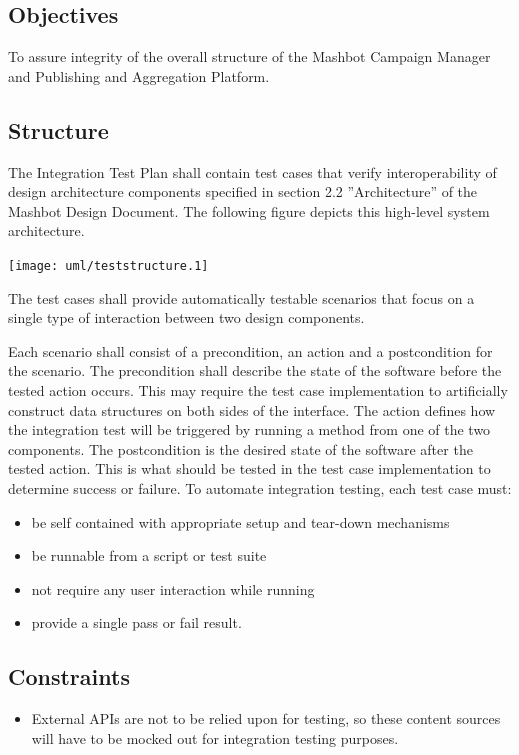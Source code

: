 \documentclass[12pt]{article}
\begin{document}
\subsection{Objectives}
To assure integrity of the overall structure of the Mashbot Campaign Manager and Publishing and Aggregation Platform.
\subsection{Structure}

The Integration Test Plan shall contain test cases that verify
interoperability of design architecture components specified in
section 2.2 ”Architecture” of the Mashbot Design Document. The
following figure depicts this high-level system architecture.

\begin{centering}
\texttt{[image: uml/teststructure.1]}
\end{centering}

The test cases shall provide automatically testable scenarios that
focus on a single type of interaction between two design components.

Each scenario shall consist of a precondition, an action and a
postcondition for the scenario. The precondition shall describe the
state of the software before the tested action occurs. This may
require the test case implementation to artificially construct data
structures on both sides of the interface. The action defines how the
integration test will be triggered by running a method from one of the
two components. The postcondition is the desired state of the software
after the tested action. This is what should be tested in the test
case implementation to determine success or failure.  To automate
integration testing, each test case must:

\begin{itemize}
\item be self contained with appropriate setup and tear-down
  mechanisms
\item be runnable from a script or test suite
\item not require any user interaction while running
\item provide a single pass or fail result.
\end{itemize}


\subsection{Constraints}
\begin{itemize}
\item External APIs are not to be relied upon for testing, so these content sources will have to be mocked out for integration testing purposes.
\end{itemize}
\end{document}
